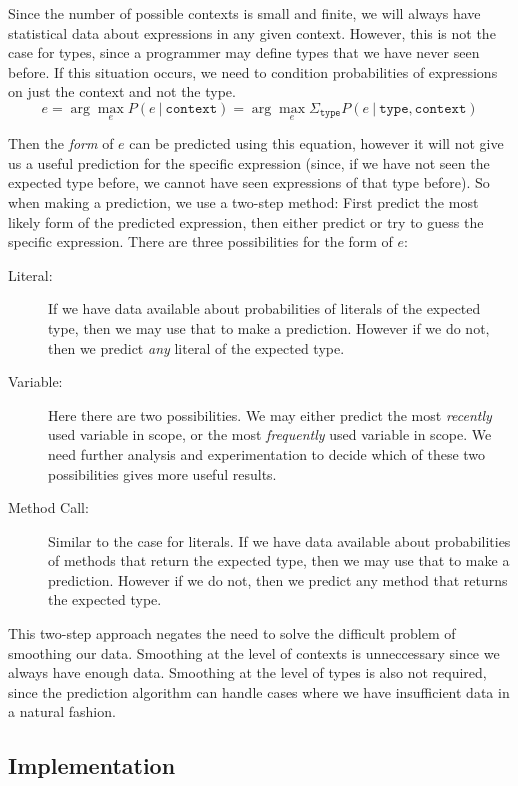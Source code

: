 \documentclass{article} %
\begin{document}
Since the number of possible contexts is small and finite, we will always have statistical data about expressions in any given context. However, this is not the case for types, since a programmer may define types that we have never seen before. If this situation occurs, we need to condition probabilities of expressions on just the context and not the type. 
$$ e = \arg\max_e P(e ~|~ \texttt{context} ) = \arg\max_e \Sigma_{\texttt{type}} P(e ~|~ \texttt{type} , \texttt{context} ) $$

Then the \emph{form} of $e$ can be predicted using this equation, however it will not give us a useful prediction for the specific expression (since, if we have not seen the expected type before, we cannot have seen expressions of that type before). So when making a prediction, we use a two-step method: First predict the most likely form of the predicted expression, then either predict or try to guess the specific expression. There are three possibilities for the form of $e$:
\begin{description}
  \item[Literal:] If we have data available about probabilities of literals of the expected type, then we may use that to make a prediction. However if we do not, then we predict \emph{any} literal of the expected type.
  \item[Variable:] Here there are two possibilities. We may either predict the most \emph{recently} used variable in scope, or the most \emph{frequently} used variable in scope. We need further analysis and experimentation to decide which of these two possibilities gives more useful results.
  \item[Method Call:] Similar to the case for literals. If we have data available about probabilities of methods that return the expected type, then we may use that to make a prediction. However if we do not, then we predict any method that returns the expected type.
\end{description}

This two-step approach negates the need to solve the difficult problem of smoothing our data. Smoothing at the level of contexts is unneccessary since we always have enough data. Smoothing at the level of types is also not required, since the prediction algorithm can handle cases where we have insufficient data in a natural fashion.

\subsection*{Implementation}
\end{document}
